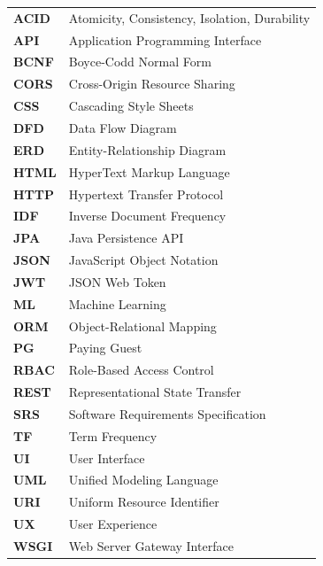 \documentclass[12pt,a4paper]{report}
\begin{document}
\begin{tabular}{ll}
\textbf{ACID} & Atomicity, Consistency, Isolation, Durability \\
\textbf{API} & Application Programming Interface \\
\textbf{BCNF} & Boyce-Codd Normal Form \\
\textbf{CORS} & Cross-Origin Resource Sharing \\
\textbf{CSS} & Cascading Style Sheets \\
\textbf{DFD} & Data Flow Diagram \\
\textbf{ERD} & Entity-Relationship Diagram \\
\textbf{HTML} & HyperText Markup Language \\
\textbf{HTTP} & Hypertext Transfer Protocol \\
\textbf{IDF} & Inverse Document Frequency \\
\textbf{JPA} & Java Persistence API \\
\textbf{JSON} & JavaScript Object Notation \\
\textbf{JWT} & JSON Web Token \\
\textbf{ML} & Machine Learning \\
\textbf{ORM} & Object-Relational Mapping \\
\textbf{PG} & Paying Guest \\
\textbf{RBAC} & Role-Based Access Control \\
\textbf{REST} & Representational State Transfer \\
\textbf{SRS} & Software Requirements Specification \\
\textbf{TF} & Term Frequency \\
\textbf{UI} & User Interface \\
\textbf{UML} & Unified Modeling Language \\
\textbf{URI} & Uniform Resource Identifier \\
\textbf{UX} & User Experience \\
\textbf{WSGI} & Web Server Gateway Interface
\end{tabular}

\newpage
{}
\listoffigures

\newpage
{}
\listoftables

\newpage
{}
\setcounter{page}{1}
\end{document}
